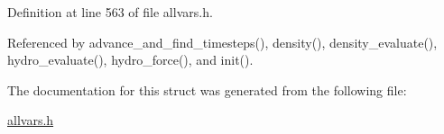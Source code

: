 Definition at line 563 of file allvars.h.



Referenced by advance\_\-and\_\-find\_\-timesteps(), density(), density\_\-evaluate(), hydro\_\-evaluate(), hydro\_\-force(), and init().



The documentation for this struct was generated from the following file:\begin{DoxyCompactItemize}
\item 
\hyperlink{allvars_8h}{allvars.h}\end{DoxyCompactItemize}
